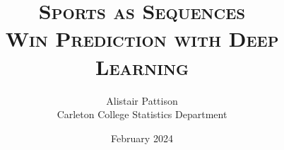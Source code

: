 \documentclass[titlepage]{article}
\title{\scshape
	Sports as Sequences \\[1em]
	\large Win Prediction with Deep Learning
}
\author{Alistair Pattison \\ {\small Carleton College Statistics Department}}
\date{February 2024}
\begin{document}
\maketitle

\begin{abstract}
\end{abstract}

\tableofcontents
\thispagestyle{empty}

\newpage

\pagestyle{fancy}
\setcounter{page}{1}








\clearpage

\printbibliography
\end{document}
